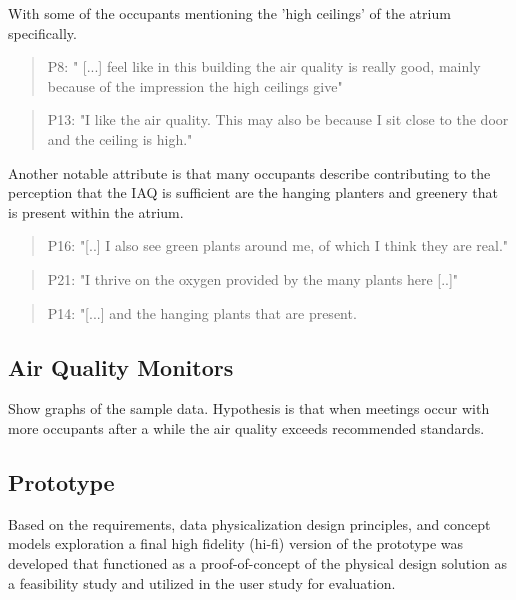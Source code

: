 With some of the occupants mentioning the 'high ceilings' of the atrium specifically.

\begin{quote}
P8: " [...] feel like in this building the air quality is really good, mainly because of the impression the high ceilings give"
\end{quote}

\begin{quote}
P13: "I like the air quality. This may also be because I sit close to the door and the ceiling is high."
\end{quote}

Another notable attribute is that many occupants describe contributing to the perception that the IAQ is sufficient are the hanging planters and greenery that is present within the atrium.

\begin{quote}
P16: "[..] I also see green plants around me, of which I think they are real."
\end{quote}

\begin{quote}
P21: "I thrive on the oxygen provided by the many plants here [..]"
\end{quote}

\begin{quote}
P14: "[...] and the hanging plants that are present.
\end{quote}



\subsection{Air Quality Monitors}
\label{sec:monitor_analysis}

Show graphs of the sample data. Hypothesis is that when meetings occur with more occupants after a while the air quality exceeds recommended standards.

\subsection{Prototype}
\label{sec:prototype_results}

Based on the requirements, data physicalization design principles, and concept models exploration a final high fidelity (hi-fi) version of the prototype was developed that functioned as a proof-of-concept of the physical design solution as a feasibility study and utilized in the user study for evaluation.

